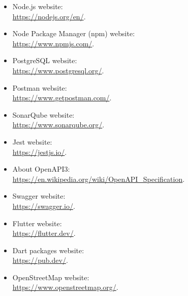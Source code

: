 \begin{itemize}
	\item Node.js website:\\
	\url{https://nodejs.org/en/}.
	
	\item Node Package Manager (npm) website:\\
	\url{https://www.npmjs.com/}.
	
	\item PostgreSQL website:\\
	\url{https://www.postgresql.org/}.
	
	\item Postman website:\\
	\url{https://www.getpostman.com/}.
	
	\item SonarQube website:\\
	\url{https://www.sonarqube.org/}.
	
	\item Jest website:\\
	\url{https://jestjs.io/}.
	
	\item About OpenAPI3:\\
	\url{https://en.wikipedia.org/wiki/OpenAPI_Specification}.

	\item Swagger website:\\
	\url{https://swagger.io/}.
	
	\item Flutter website:\\
	\url{https://flutter.dev/}.
	
	\item Dart packages website:\\
	\url{https://pub.dev/}.
	
	\item OpenStreetMap website:\\
	\url{https://www.openstreetmap.org/}.
\end{itemize}